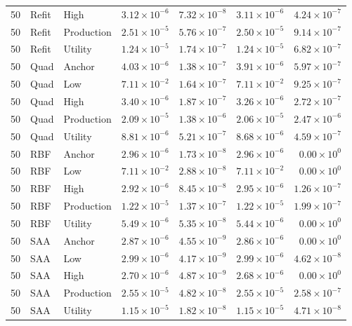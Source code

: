 \begin{longtable}{rllrrrr}
50 & Refit & High & $3.12\times10^{-6}$ & $7.32\times10^{-8}$ & $3.11\times10^{-6}$ & $4.24\times10^{-7}$\\
50 & Refit & Production & $2.51\times10^{-5}$ & $5.76\times10^{-7}$ & $2.50\times10^{-5}$ & $9.14\times10^{-7}$\\
50 & Refit & Utility & $1.24\times10^{-5}$ & $1.74\times10^{-7}$ & $1.24\times10^{-5}$ & $6.82\times10^{-7}$\\
50 & Quad & Anchor & $4.03\times10^{-6}$ & $1.38\times10^{-7}$ & $3.91\times10^{-6}$ & $5.97\times10^{-7}$\\
50 & Quad & Low & $7.11\times10^{-2}$ & $1.64\times10^{-7}$ & $7.11\times10^{-2}$ & $9.25\times10^{-7}$\\
50 & Quad & High & $3.40\times10^{-6}$ & $1.87\times10^{-7}$ & $3.26\times10^{-6}$ & $2.72\times10^{-7}$\\
50 & Quad & Production & $2.09\times10^{-5}$ & $1.38\times10^{-6}$ & $2.06\times10^{-5}$ & $2.47\times10^{-6}$\\
50 & Quad & Utility & $8.81\times10^{-6}$ & $5.21\times10^{-7}$ & $8.68\times10^{-6}$ & $4.59\times10^{-7}$\\
50 & RBF & Anchor & $2.96\times10^{-6}$ & $1.73\times10^{-8}$ & $2.96\times10^{-6}$ & $0.00\times10^{0}$\\
50 & RBF & Low & $7.11\times10^{-2}$ & $2.88\times10^{-8}$ & $7.11\times10^{-2}$ & $0.00\times10^{0}$\\
50 & RBF & High & $2.92\times10^{-6}$ & $8.45\times10^{-8}$ & $2.95\times10^{-6}$ & $1.26\times10^{-7}$\\
50 & RBF & Production & $1.22\times10^{-5}$ & $1.37\times10^{-7}$ & $1.22\times10^{-5}$ & $1.99\times10^{-7}$\\
50 & RBF & Utility & $5.49\times10^{-6}$ & $5.35\times10^{-8}$ & $5.44\times10^{-6}$ & $0.00\times10^{0}$\\
50 & SAA & Anchor & $2.87\times10^{-6}$ & $4.55\times10^{-9}$ & $2.86\times10^{-6}$ & $0.00\times10^{0}$\\
50 & SAA & Low & $2.99\times10^{-6}$ & $4.17\times10^{-9}$ & $2.99\times10^{-6}$ & $4.62\times10^{-8}$\\
50 & SAA & High & $2.70\times10^{-6}$ & $4.87\times10^{-9}$ & $2.68\times10^{-6}$ & $0.00\times10^{0}$\\
50 & SAA & Production & $2.55\times10^{-5}$ & $4.82\times10^{-8}$ & $2.55\times10^{-5}$ & $2.58\times10^{-7}$\\
50 & SAA & Utility & $1.15\times10^{-5}$ & $1.82\times10^{-8}$ & $1.15\times10^{-5}$ & $4.71\times10^{-8}$\\

\end{longtable}
